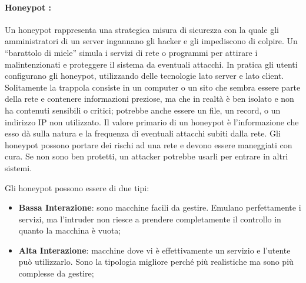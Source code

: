 \paragraph{Honeypot {\normalfont {}}:}
Un honeypot rappresenta una strategica misura di sicurezza con la quale gli
amministratori
di un server ingannano gli hacker e gli impediscono di colpire.
Un “barattolo di miele” simula i
servizi di rete o programmi per attirare i malintenzionati e proteggere il
sistema da eventuali
attacchi. In pratica gli utenti configurano gli honeypot, utilizzando delle
tecnologie lato server e lato
client. Solitamente la trappola consiste in un computer o un sito che sembra
essere parte della rete
e contenere informazioni preziose, ma che in realtà è ben isolato e non ha
contenuti sensibili o
critici; potrebbe anche essere un file, un record, o un indirizzo IP non utilizzato.
Il valore primario di un honeypot è l'informazione che esso dà sulla natura e la
frequenza di
eventuali attacchi subiti dalla rete.
Gli honeypot possono portare dei rischi ad una rete e devono essere maneggiati
con cura. Se non
sono ben protetti, un attacker potrebbe usarli per entrare in altri sistemi.

Gli honeypot possono essere di due tipi:
\begin{itemize}
      \item \textbf{Bassa Interazione}: sono macchine facili da gestire. Emulano perfettamente
            i servizi, ma l'intruder non riesce a prendere completamente il controllo in
            quanto la macchina è vuota;
      \item \textbf{Alta Interazione}: macchine dove vi è effettivamente un servizio e
            l'utente può utilizzarlo.
            Sono la tipologia migliore perché più realistiche ma sono più complesse
            da gestire;
\end{itemize}